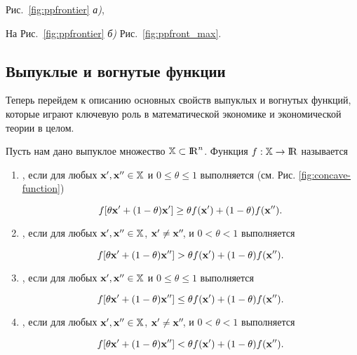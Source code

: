 


Рис.~\ref{fig:ppfrontier} \emph{а)},

На Рис.~\ref{fig:ppfrontier} \emph{б)}  Рис.~\ref{fig:ppfront_max}.








\subsection{Выпуклые и вогнутые функции}

    Теперь перейдем к описанию основных свойств выпуклых и вогнутых функций, которые играют
    ключевую роль в математической экономике и экономической теории в целом.


\begin{dfn}
Пусть нам дано выпуклое множество $\mathbb{X} \subset {\rm I\!R}^n$. Функция
    $f: \mathbb{X} \to {\rm I\!R}$ называется

\begin{enumerate}
\renewcommand{\theenumi}{(\asbuk{enumi})}

  \item  {},
если для любых $\mathbf{x}', \mathbf{x}'' \in \mathbb{X}$ и $0 \leq \theta \leq
1$ выполняется (см. Рис. \ref{fig:concave-function})

\[
    f[\theta \mathbf{x}' + (1-\theta)\mathbf{x}'] \geq \theta f(\mathbf{x}') +
    (1-\theta)f(\mathbf{x}'').
\]

  \item {},
если для любых $\mathbf{x}', \mathbf{x}'' \in \mathbb{X}$, $\mathbf{x}' \neq
\mathbf{x}''\!$, и $0 < \theta < 1$ выполняется

\[
f[\theta \mathbf{x}' + (1-\theta)\mathbf{x}''] > \theta f(\mathbf{x}') +
(1-\theta)f(\mathbf{x}'').
\]

  \item {},
если для любых $\mathbf{x}', \mathbf{x}'' \in \mathbb{X}$ и $0 \leq \theta \leq
1$ выполняется

\[
f[\theta \mathbf{x}' + (1-\theta)\mathbf{x}''] \leq \theta f(\mathbf{x}') +
(1-\theta)f(\mathbf{x}'').
\]

\item {},
если для любых $\mathbf{x}', \mathbf{x}'' \in \mathbb{X}$, $\mathbf{x}' \neq
\mathbf{x}''\!$, и $0 < \theta < 1$ выполняется

\[
f[\theta \mathbf{x}' + (1-\theta)\mathbf{x}''] < \theta f(\mathbf{x}') +
(1-\theta)f(\mathbf{x}'').
\]

\end{enumerate}
\end{dfn}


